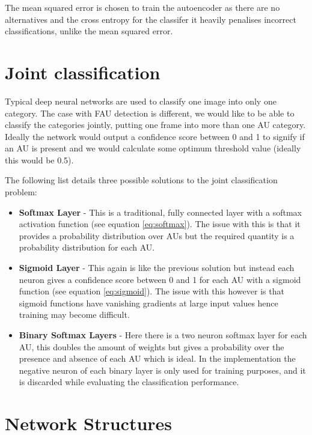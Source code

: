     The mean squared error is chosen to train the autoencoder as there are no alternatives
    and the cross entropy for the classifer it heavily penalises incorrect classifications,
    unlike the mean squared error.

  \section{Joint classification}

    Typical deep neural networks are used to classify
    one image into only one category. The case with FAU detection is different, we
    would like to be able to classify the categories jointly,  putting one frame into more than
    one AU category. Ideally the network would output a confidence score between 0 and 1
    to signify if an AU is present and we would calculate some optimum threshold value
    (ideally this would be 0.5).

    The following list details three possible solutions to the joint classification problem:

    \begin{itemize} \label{sec:binsoft}
      \item {\bf Softmax Layer} - This is a traditional, fully connected layer with
      a softmax activation function (see equation \ref{eq:softmax}).
      The issue with this is that it provides a probability distribution over AUs
      but the required quantity is a probability distribution for each AU.
      \item {\bf Sigmoid Layer} - This again is like the previous solution but instead each neuron gives a confidence
      score between 0 and 1 for each AU with a sigmoid function (see equation \ref{eq:sigmoid}).
      The issue with this however is that sigmoid
      functions have vanishing gradients at large input values
      hence training may become difficult.
      \item {\bf Binary Softmax Layers} - Here there is a two neuron softmax layer
      for each AU, this doubles the amount of weights
      but gives a probability over the presence and
      absence of each AU which is ideal. In the implementation
      the negative neuron of each binary layer is only used for training purposes, and it is
      discarded while evaluating the classification performance.
    \end{itemize}




  \section{Network Structures}


